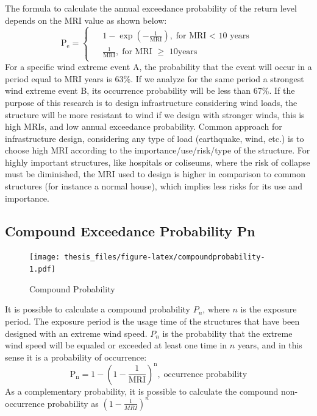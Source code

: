 \documentclass[12pt,twoside]{reedthesis}
\begin{document}
The formula to calculate the annual exceedance probability of the return level depends on the MRI value as shown below:
\begin{equation}
\mathrm{
        P_e = 
        \begin{cases}
          \begin{split}
                &1-\exp\left(-\frac{1}{MRI}\right),\;\textrm{for MRI < 10 years}
                \\
                &\frac{1}{MRI},\;\textrm{for MRI }\geq\textrm{ 10years}      
          \end{split}
        \end{cases}
       }
  \label{eq:pe}
\end{equation}
For a specific wind extreme event A, the probability that the event will occur in a period equal to MRI years is 63\%. If we analyze for the same period a strongest wind extreme event B, its occurrence probability will be less than 67\%. If the purpose of this research is to design infrastructure considering wind loads, the structure will be more resistant to wind if we design with stronger winds, this is high MRIs, and low annual exceedance probability. Common approach for infrastructure design, considering any type of load (earthquake, wind, etc.) is to choose high MRI according to the importance/use/risk/type of the structure. For highly important structures, like hospitals or coliseums, where the risk of collapse must be diminished, the MRI used to design is higher in comparison to common structures (for instance a normal house), which implies less risks for its use and importance.

\hypertarget{compound-exceedance-probability-pn}{%
\subsection{Compound Exceedance Probability Pn}\label{compound-exceedance-probability-pn}}

\footnotesize
\begin{figure}
\centering
\texttt{[image: thesis\_files/figure-latex/compoundprobability-1.pdf]}
\caption{\label{fig:compoundprobability}Compound Probability}
\end{figure}
\normalsize

It is possible to calculate a compound probability \(P_n\), where \(n\) is the exposure period. The exposure period is the usage time of the structures that have been designed with an extreme wind speed. \(P_n\) is the probability that the extreme wind speed will be equaled or exceeded at least one time in \(n\) years, and in this sense it is a probability of occurrence:
\begin{equation}
\mathrm{
        P_n = 1-\left(1-\frac{1}{MRI}\right)^n,\;\textrm{occurrence probability}
       }
  \label{eq:pn}
\end{equation}
As a complementary probability, it is possible to calculate the compound non-occurrence probability as \(\left(1-\frac{1}{MRI}\right)^n\)
\end{document}
